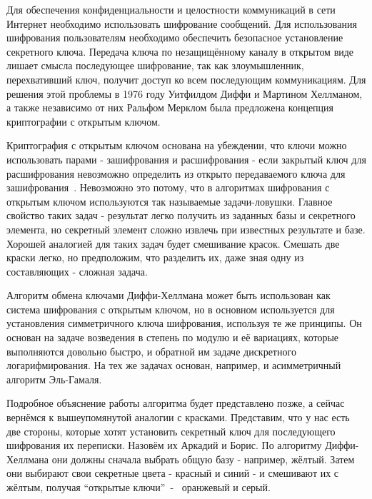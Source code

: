 \documentclass[times,specification,annotation]{itmo-student-thesis}
\begin{document}
Для обеспечения конфиденциальности и целостности коммуникаций в сети Интернет необходимо использовать
шифрование сообщений.
Для использования шифрования пользователям необходимо обеспечить безопасное установление секретного ключа.
Передача ключа по незащищённому каналу в открытом виде лишает смысла последующее шифрование, так как
злоумышленник, перехвативший ключ, получит доступ ко всем последующим коммуникациям.
Для решения этой проблемы в 1976 году Уитфилдом Диффи и Мартином Хеллманом, а также независимо от них Ральфом Мерклом
была предложена концепция криптографии с открытым ключом.\par
Криптография с открытым ключом основана на убеждении, что ключи можно использовать парами - зашифрования и расшифрования -
если закрытый ключ для расшифрования невозможно определить из открыто передаваемого ключа для зашифрования~\cite{dif77}.
Невозможно это потому, что в алгоритмах шифрования с открытым ключом используются так называемые задачи-ловушки.
Главное свойство таких задач - результат легко получить из заданных базы и секретного элемента, но секретный элемент
сложно извлечь при известных результате и базе.
Хорошей аналогией для таких задач будет смешивание красок.
Смешать две краски легко, но предположим, что разделить их, даже зная одну из составляющих - сложная задача.\par
Алгоритм обмена ключами Диффи-Хеллмана может быть использован как система шифрования с открытым ключом, но в основном
используется для установления симметричного ключа шифрования, используя те же принципы.
Он основан на задаче возведения в степень по модулю и её вариациях, которые выполняются довольно быстро, и обратной им задаче
дискретного логарифмирования.
На тех же задачах основан, например, и асимметричный алгоритм Эль-Гамаля.\par
Подробное объяснение работы алгоритма будет представлено позже, а сейчас вернёмся к вышеупомянутой аналогии с красками.
Представим, что у нас есть две стороны, которые хотят установить секретный ключ для последующего шифрования их переписки.
Назовём их Аркадий и Борис.
По алгоритму Диффи-Хеллмана они должны сначала выбрать общую базу - например, жёлтый.
Затем они выбирают свои секретные цвета - красный и синий - и смешивают их с жёлтым, получая ``открытые ключи''~-
~оранжевый и серый.\par
\end{document}

